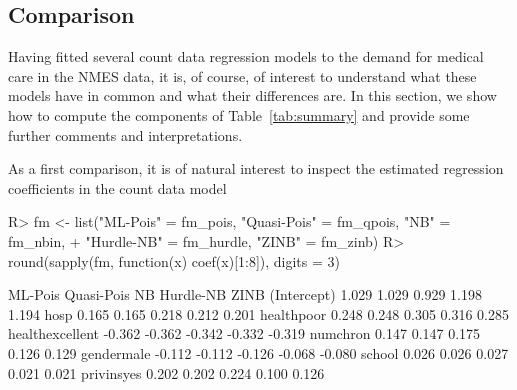 \documentclass{Z}
\begin{document}
\subsection{Comparison}

Having fitted several count data regression models to the demand for medical care
in the NMES data, it is, of course, of interest to understand what these models have
in common and what their differences are. In this section, we show how to compute
the components of Table~\ref{tab:summary} and provide some further comments and
interpretations. 

As a first comparison, it is of natural
interest to inspect the estimated regression coefficients in the count data model

\begin{Schunk}
\begin{Sinput}
R> fm <- list("ML-Pois" = fm_pois, "Quasi-Pois" = fm_qpois, "NB" = fm_nbin,
+   "Hurdle-NB" = fm_hurdle, "ZINB" = fm_zinb)
R> round(sapply(fm, function(x) coef(x)[1:8]), digits = 3)
\end{Sinput}
\begin{Soutput}
                ML-Pois Quasi-Pois     NB Hurdle-NB   ZINB
(Intercept)       1.029      1.029  0.929     1.198  1.194
hosp              0.165      0.165  0.218     0.212  0.201
healthpoor        0.248      0.248  0.305     0.316  0.285
healthexcellent  -0.362     -0.362 -0.342    -0.332 -0.319
numchron          0.147      0.147  0.175     0.126  0.129
gendermale       -0.112     -0.112 -0.126    -0.068 -0.080
school            0.026      0.026  0.027     0.021  0.021
privinsyes        0.202      0.202  0.224     0.100  0.126
\end{Soutput}
\end{Schunk}
\end{document}
